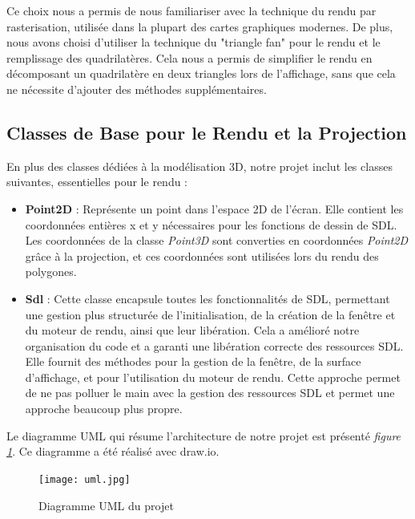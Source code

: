 \documentclass[12pt]{article}
\begin{document}
\noindent Ce choix nous a permis de nous familiariser avec la technique du rendu par rasterisation, utilisée dans la plupart des cartes graphiques modernes. De plus, nous avons choisi d'utiliser la technique du "triangle fan" pour le rendu et le remplissage des quadrilatères. Cela nous a permis de simplifier le rendu en décomposant un quadrilatère en deux triangles lors de l'affichage, sans que cela ne nécessite d'ajouter des méthodes supplémentaires.

\subsection{Classes de Base pour le Rendu et la Projection}
\label{subsec:classes_base}

\noindent En plus des classes dédiées à la modélisation 3D, notre projet inclut les classes suivantes, essentielles pour le rendu :
\begin{itemize}
  \item \textbf{Point2D} : Représente un point dans l'espace 2D de l'écran. Elle contient les coordonnées entières x et y nécessaires pour les fonctions de dessin de SDL. Les coordonnées de la classe \textit{Point3D} sont converties en coordonnées \textit{Point2D} grâce à la projection, et ces coordonnées sont utilisées lors du rendu des polygones.
  \item \textbf{Sdl} : Cette classe encapsule toutes les fonctionnalités de SDL, permettant une gestion plus structurée de l'initialisation, de la création de la fenêtre et du moteur de rendu, ainsi que leur libération. Cela a amélioré notre organisation du code et a garanti une libération correcte des ressources SDL. Elle fournit des méthodes pour la gestion de la fenêtre, de la surface d'affichage, et pour l'utilisation du moteur de rendu. Cette approche permet de ne pas polluer le main avec la gestion des ressources SDL et permet une approche beaucoup plus propre.
\end{itemize}

\label{sec:diagramme}

\noindent Le diagramme UML qui résume l'architecture de notre projet est présenté \textit{figure \ref{fig:uml}}. Ce diagramme a été réalisé avec draw.io.

\begin{figure}[h]
\begin{center}
\texttt{[image: uml.jpg]}
\end{center}
\caption{Diagramme UML du projet}
\label{fig:uml}
\end{figure}
\end{document}
